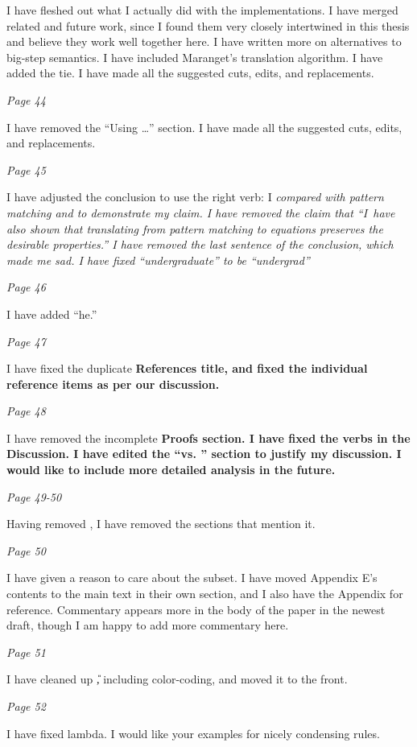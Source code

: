 \documentclass[manuscript,screen, 12pt, nonacm]{acmart}
\begin{document}
I have fleshed out what I actually did with the implementations. I have merged
related and future work, since I found them very closely intertwined in this
thesis and believe they work well together here. I have written more on
alternatives to big-step semantics. I have included Maranget's translation
algorithm. I have added the tie. I have made all the suggested cuts, edits, and
replacements. 

\it{Page 44}

I have removed the “Using \VMinus\dots” section. I have made all the suggested
cuts, edits, and replacements. 

\it{Page 45}

I have adjusted the conclusion to use the right verb: I \it{compared} \VMinus
with pattern matching and \VC to demonstrate my claim. I have removed the claim
that “I~have also shown that translating from pattern matching to equations
preserves the desirable properties.” I have removed the last sentence of the
conclusion, which made me sad. I have fixed “undergraduate” to be “undergrad”

\it{Page 46}

I have added “he.”

\it{Page 47}

I have fixed the duplicate \bf{References} title, and fixed the individual
reference items as per our discussion. 

\it{Page 48}

I have removed the incomplete \bf{Proofs} section. I have fixed the verbs in the
Discussion. I have edited the “\VMinus vs. \VC” section to justify my
discussion. I would like to include more detailed analysis in the future. 

\it{Page 49-50}

Having removed \PPlus, I have removed the sections that mention it. 

\it{Page 50}

I have given a reason to care about the subset. I have moved Appendix E's
contents to the main text in their own section, and I also have the Appendix for
reference. Commentary appears more in the body of the paper in the newest draft,
though I am happy to add more commentary here. 

\it{Page 51}

I have cleaned up \U, including color-coding, and moved it to the front.

\it{Page 52}

I have fixed lambda. I would like your examples for nicely condensing rules. 
\end{document}
